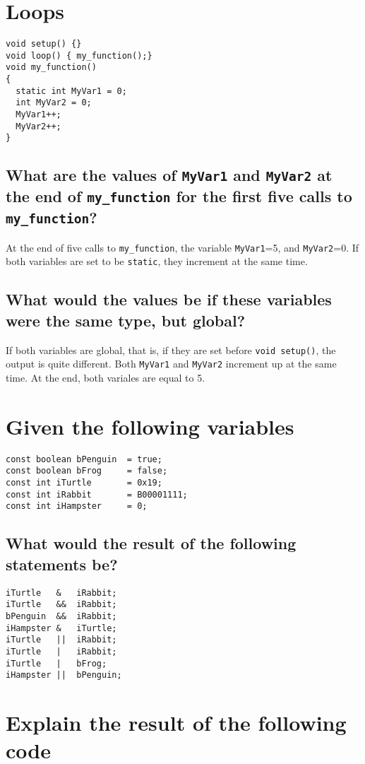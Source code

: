 \documentclass{hw}
\begin{document}
\section{Loops}
\begin{lstlisting}
void setup() {}
void loop() { my_function();}
void my_function()
{
  static int MyVar1 = 0;
  int MyVar2 = 0;
  MyVar1++;
  MyVar2++;
}
\end{lstlisting}
\subsection{What are the values of \texttt{MyVar1} and \texttt{MyVar2} at the end
of \texttt{my\_function} for the first five calls to \texttt{my\_function}?}
At the end of five calls to \texttt{my\_function}, the variable
\texttt{MyVar1}=5, and \texttt{MyVar2}=0. If both variables are set to be
\texttt{static}, they increment at the same time.
\subsection{What would the values be if these variables were the same type, but
global?}
If both variables are global, that is, if they are set before \texttt{void
setup()}, the output is quite different. Both \texttt{MyVar1} and
\texttt{MyVar2} increment up at the same time. At the end, both variales are
equal to 5.

\section{Given the following variables}
\begin{lstlisting}
const boolean bPenguin  = true;
const boolean bFrog     = false;
const int iTurtle       = 0x19;
const int iRabbit       = B00001111;
const int iHampster     = 0;
\end{lstlisting}
\newpage
\subsection{What would the result of the following statements be?}
\begin{lstlisting}
iTurtle   &   iRabbit;
iTurtle   &&  iRabbit;
bPenguin  &&  iRabbit;
iHampster &   iTurtle;
iTurtle   ||  iRabbit;
iTurtle   |   iRabbit;
iTurtle   |   bFrog;
iHampster ||  bPenguin;
\end{lstlisting}

\section{Explain the result of the following code}
\end{document}
